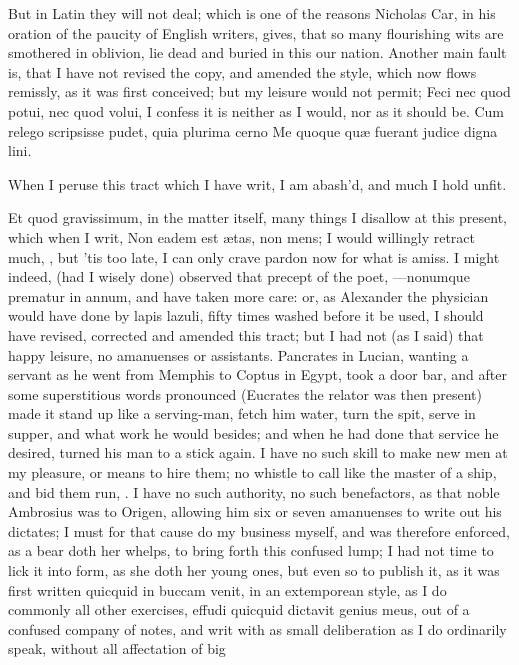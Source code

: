 {But in Latin they will not deal; which is one of the reasons
Nicholas Car, in his oration of the paucity of English writers,
gives, that so many flourishing wits are smothered in oblivion, lie
dead and buried in this our nation. Another main fault is, that I have
not revised the copy, and amended the style, which now flows remissly,
as it was first conceived; but my leisure would not permit; Feci nec
quod potui, nec quod volui, I confess it is neither as I would, nor as
it should be.
Cum relego scripsisse pudet, quia plurima cerno
Me quoque qu\ae{} fuerant judice digna lini.

When I peruse this tract which I have writ,
I am abash'd, and much I hold unfit.

Et quod gravissimum, in the matter itself, many things I disallow at
this present, which when I writ, Non eadem est \ae{}tas, non mens; I
would willingly retract much, \etc, but 'tis too late, I can only crave
pardon now for what is amiss. I might indeed, (had I wisely done)
observed that precept of the poet, ---nonumque prematur in annum, and
have taken more care: or, as Alexander the physician would have done by
lapis lazuli, fifty times washed before it be used, I should have
revised, corrected and amended this tract; but I had not (as I said)
that happy leisure, no amanuenses or assistants. Pancrates in
Lucian, wanting a servant as he went from Memphis to Coptus in
Egypt, took a door bar, and after some superstitious words pronounced
(Eucrates the relator was then present) made it stand up like a
serving-man, fetch him water, turn the spit, serve in supper, and what
work he would besides; and when he had done that service he desired,
turned his man to a stick again. I have no such skill to make new men
at my pleasure, or means to hire them; no whistle to call like the
master of a ship, and bid them run, \etc. I have no such authority, no
such benefactors, as that noble Ambrosius was to Origen, allowing
him six or seven amanuenses to write out his dictates; I must for that
cause do my business myself, and was therefore enforced, as a bear doth
her whelps, to bring forth this confused lump; I had not time to lick
it into form, as she doth her young ones, but even so to publish it, as
it was first written quicquid in buccam venit, in an extemporean style,
as I do commonly all other exercises, effudi quicquid dictavit
genius meus, out of a confused company of notes, and writ with as small
deliberation as I do ordinarily speak, without all affectation of big
}
